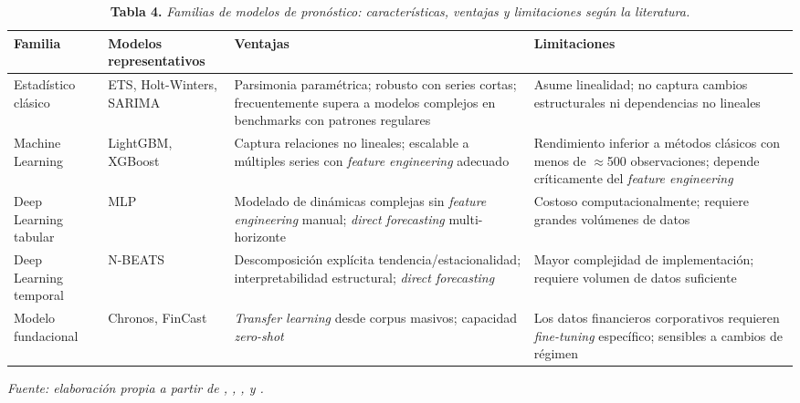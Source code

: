 \begin{table}[H]
\caption{\textbf{Tabla 4.} \textit{Familias de modelos de pronóstico: características, ventajas y limitaciones según la literatura.}}
\label{tab:familias_modelos}
\vspace{4pt}
\begin{tabular}{>{\raggedright\arraybackslash}p{2.8cm} >{\raggedright\arraybackslash}p{2.8cm} >{\raggedright\arraybackslash}p{3.8cm} >{\raggedright\arraybackslash}p{4.2cm}}
\toprule
\textbf{Familia} & \textbf{Modelos representativos} & \textbf{Ventajas} & \textbf{Limitaciones} \\
\midrule
Estadístico clásico & ETS, Holt-Winters, SARIMA & Parsimonia paramétrica; robusto con series cortas; frecuentemente supera a modelos complejos en benchmarks con patrones regulares \parencite{Makridakis2022} & Asume linealidad; no captura cambios estructurales ni dependencias no lineales \parencite{Hyndman2021} \\
Machine Learning & LightGBM, XGBoost & Captura relaciones no lineales; escalable a múltiples series con \textit{feature engineering} adecuado \parencite{Januschowski2020} & Rendimiento inferior a métodos clásicos con menos de $\approx$500 observaciones; depende críticamente del \textit{feature engineering} \parencite{Cerqueira2022} \\
Deep Learning tabular & MLP & Modelado de dinámicas complejas sin \textit{feature engineering} manual; \textit{direct forecasting} multi-horizonte & Costoso computacionalmente; requiere grandes volúmenes de datos \parencite{LimZohren2021} \\
Deep Learning temporal & N-BEATS & Descomposición explícita tendencia/estacionalidad; interpretabilidad estructural; \textit{direct forecasting} & Mayor complejidad de implementación; requiere volumen de datos suficiente \parencite{Oreshkin2020} \\
Modelo fundacional & Chronos, FinCast & \textit{Transfer learning} desde corpus masivos; capacidad \textit{zero-shot} \parencite{Ansari2024} & Los datos financieros corporativos requieren \textit{fine-tuning} específico; sensibles a cambios de régimen \parencite{Rahimikia2025} \\
\bottomrule
\end{tabular}
\vspace{4pt}

\small\textit{Fuente: elaboración propia a partir de \textcite{Hyndman2021}, \textcite{Januschowski2020}, \textcite{LimZohren2021}, \textcite{Ansari2024} y \textcite{Rahimikia2025}.}
\end{table}

